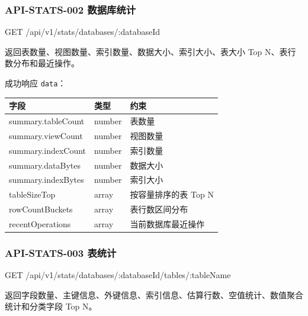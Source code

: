 \documentclass[
  a4paper,
  UTF8]{ctexart}
\newenvironment{Shaded}{}{}
\newcommand{\NormalTok}[1]{#1}
\begin{document}
\hypertarget{api-stats-002-ux6570ux636eux5e93ux7edfux8ba1}{%
\subsubsection{API-STATS-002
数据库统计}\label{api-stats-002-ux6570ux636eux5e93ux7edfux8ba1}}

\begin{Shaded}
\begin{Highlighting}[]
\NormalTok{GET /api/v1/stats/databases/:databaseId}
\end{Highlighting}
\end{Shaded}

返回表数量、视图数量、索引数量、数据大小、索引大小、表大小 Top
N、表行数分布和最近操作。

成功响应 \texttt{data}：

\begin{longtable}[]{@{}lll@{}}
\toprule
字段 & 类型 & 约束 \\
\midrule
\endhead
summary.tableCount & number & 表数量 \\
summary.viewCount & number & 视图数量 \\
summary.indexCount & number & 索引数量 \\
summary.dataBytes & number & 数据大小 \\
summary.indexBytes & number & 索引大小 \\
tableSizeTop & array & 按容量排序的表 Top N \\
rowCountBuckets & array & 表行数区间分布 \\
recentOperations & array & 当前数据库最近操作 \\
\bottomrule
\end{longtable}

\hypertarget{api-stats-003-ux8868ux7edfux8ba1}{%
\subsubsection{API-STATS-003
表统计}\label{api-stats-003-ux8868ux7edfux8ba1}}

\begin{Shaded}
\begin{Highlighting}[]
\NormalTok{GET /api/v1/stats/databases/:databaseId/tables/:tableName}
\end{Highlighting}
\end{Shaded}

返回字段数量、主键信息、外键信息、索引信息、估算行数、空值统计、数值聚合统计和分类字段
Top N。
\end{document}

